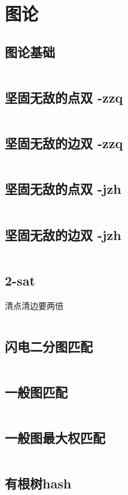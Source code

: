 \chapter{图论}
\section{图论基础}
\inputminted{cpp}{\source/graph-theory/basic.cpp}
\section{坚固无敌的点双 -zzq}
\inputminted{cpp}{\source/graph-theory/Biconnected-Point-Component -zzq.cpp}
\section{坚固无敌的边双 -zzq}
\inputminted{cpp}{\source/graph-theory/Biconnected-Edge-Component -zzq.cpp}

\section{坚固无敌的点双 -jzh}
\inputminted{cpp}{\source/graph-theory/biconnected-graph-vertex -jzh.cpp}
\section{坚固无敌的边双 -jzh}
\inputminted{cpp}{\source/graph-theory/biconnected-graph-edge -jzh.cpp}
\section{2-sat}
清点清边要两倍\inputminted{cpp}{\source/graph-theory/two-satisfiability.cpp}
\section{闪电二分图匹配}
\inputminted{cpp}{\source/graph-theory/Hopcroft-Karp.cpp}
\section{一般图匹配}
\inputminted{cpp}{\source/graph-theory/general-matching.cpp}
\section{一般图最大权匹配}
\inputminted{cpp}{\source/graph-theory/weighted_blossom.cpp}
\section{有根树hash}
\inputminted{cpp}{\source/graph-theory/rooted-tree-isomorphism.cpp}
